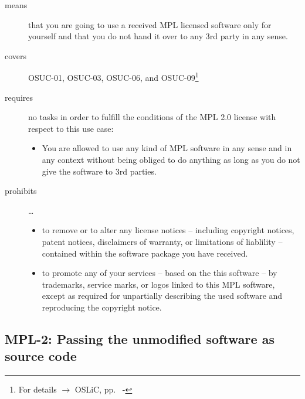 \begin{description}

\item[means] that you are going to use a received MPL licensed software only
for yourself and that you do not hand it over to any 3rd party in any sense.

\item[covers] OSUC-01, OSUC-03, OSUC-06, and OSUC-09\footnote{For details 
$\rightarrow$ OSLiC, pp.\ \pageref{OSUC-01-DEF} - \pageref{OSUC-09-DEF}}

\item[requires] no tasks in order to fulfill the conditions of the MPL 2.0
license with respect to this use case:
  \begin{itemize}
    \item You are allowed to use any kind of MPL software in any sense and in
    any context without being obliged to do anything as long as you do not
    give the software to 3rd parties.
  \end{itemize}

\item[prohibits] \ldots
\begin{itemize}
  \item to remove or to alter any license notices -- including copyright
  notices, patent notices, disclaimers of warranty, or limitations of liablility
  -- contained within the software package you have received.
  \item to promote any of your services -- based on the this software -- by
  trademarks, service marks, or logos linked to this MPL software, except as
  required for unpartially describing the used software and reproducing the
  copyright notice.
\end{itemize}

\end{description}

\subsection{MPL-2: Passing the unmodified software as source code}
\label{OSUC-02S-MPL} \label{OSUC-05S-MPL} \label{OSUC-07S-MPL} 

